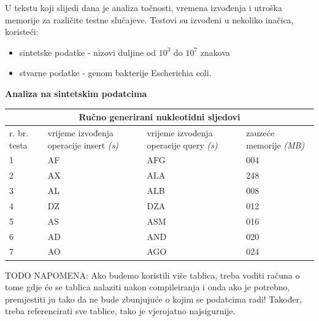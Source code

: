 \documentclass[times, utf8, seminar, numeric]{fer}
\begin{document}
U tekstu koji slijedi dana je analiza točnosti, vremena izvođenja i utroška memorije za različite testne slučajeve. Testovi su izvođeni u nekoliko inačica, koristeći:
\begin{itemize}

  \item {sintetske podatke - nizovi duljine od $10^3$ do $10^7$ znakova}
  \item {stvarne podatke - genom bakterije Escherichia coli.}

\end{itemize}


\begin{flushleft}
\textbf{Analiza na sintetskim podatcima}
\end{flushleft}

\begin{tabular}
{ |p{0.8cm}||p{4cm}|p{4cm}|p{4cm}|  }
 \hline
 \multicolumn{4}{|c|}{Ručno generirani nukleotidni sljedovi} \\
 \hline
 r. br. testa& vrijeme izvođenja operacije insert \textit{(s)} & vrijeme izvođenja operacije query \textit{(s)} &zauzeće memorije \textit{(MB)}\\
 \hline
 1& AF    &AFG&   004\\
 2&   AX  & ALA   &248\\
 3&AL & ALB&  008\\
 4&DZ & DZA&  012\\
 5&   AS  & ASM&016\\
 6& AD  & AND   &020\\
 7& AO  & AGO&024\\
 \hline
\end{tabular}

\vspace{10mm} 

TODO NAPOMENA: Ako budemo koristili više tablica, treba voditi računa o tome gdje će se tablica nalaziti nakon compileiranja i onda ako je potrebno, premjestiti ju tako da ne bude zbunjujuće o kojim se podatcima radi! Također, treba referencirati sve tablice, tako je vjerojatno najsigurnije.
\end{document}
